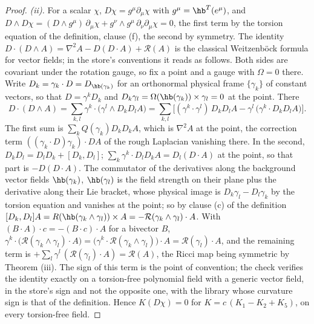 \begin{proof}
\emph{(ii).} For a scalar $\chi$, $D\chi = g^{\mu}\partial_{\mu}\chi$ with $g^{\mu} = \hb^{T}(e^{\mu})$, and $D\wedge D\chi = (D\wedge g^{\mu})\,\partial_{\mu}\chi + g^{\nu}\wedge g^{\mu}\,\partial_{\nu}\partial_{\mu}\chi = 0$, the first term by the torsion equation of the definition, clause (f), the second by symmetry. The identity $D\cdot(D\wedge A) = \nabla^{2}A - D(D\cdot A) + \mathcal{R}(A)$ is the classical Weitzenb\"ock formula for vector fields; in the store's conventions it reads as follows. Both sides are covariant under the rotation gauge, so fix a point and a gauge with $\Omega = 0$ there. Write $D_{k} = \gamma_{k}\cdot D = D_{\hb(\gamma_{k})}$ for an orthonormal physical frame $\{\gamma_{k}\}$ of constant vectors, so that $D = \gamma^{k}D_{k}$ and $D_{k}\gamma_{l} = \Omega(\hb(\gamma_{k}))\times\gamma_{l} = 0$ at the point. There
\[
D\cdot(D\wedge A) = \sum_{k,l}\gamma^{k}\cdot\bigl(\gamma^{l}\wedge D_{k}D_{l}A\bigr) = \sum_{k,l}\bigl[(\gamma^{k}\cdot\gamma^{l})\,D_{k}D_{l}A - \gamma^{l}\,\bigl(\gamma^{k}\cdot D_{k}D_{l}A\bigr)\bigr] .
\]
The first sum is $\sum_{k}Q(\gamma_{k})D_{k}D_{k}A$, which is $\nabla^{2}A$ at the point, the correction term $((\gamma_{k}\cdot D)\gamma_{k})\cdot D A$ of the rough Laplacian vanishing there. In the second, $D_{k}D_{l} = D_{l}D_{k} + [D_{k}, D_{l}]$; $\sum_{k}\gamma^{k}\cdot D_{l}D_{k}A = D_{l}(D\cdot A)$ at the point, so that part is $-D(D\cdot A)$. The commutator of the derivatives along the background vector fields $\hb(\gamma_{k})$, $\hb(\gamma_{l})$ is the field strength on their plane plus the derivative along their Lie bracket, whose physical image is $D_{k}\gamma_{l} - D_{l}\gamma_{k}$ by the torsion equation and vanishes at the point; so by clause (c) of the definition $[D_{k}, D_{l}]A = R(\hb(\gamma_{k}\wedge\gamma_{l}))\times A = -\mathcal{R}(\gamma_{k}\wedge\gamma_{l})\cdot A$. With $(B\cdot A)\cdot c = -(B\cdot c)\cdot A$ for a bivector $B$, $\gamma^{k}\cdot\bigl(\mathcal{R}(\gamma_{k}\wedge\gamma_{l})\cdot A\bigr) = \bigl(\gamma^{k}\cdot\mathcal{R}(\gamma_{k}\wedge\gamma_{l})\bigr)\cdot A = \mathcal{R}(\gamma_{l})\cdot A$, and the remaining term is $+\sum_{l}\gamma^{l}\,(\mathcal{R}(\gamma_{l})\cdot A) = \mathcal{R}(A)$, the Ricci map being symmetric by Theorem (iii). The sign of this term is the point of convention; the check verifies the identity exactly on a torsion-free polynomial field with a generic vector field, in the store's sign and not the opposite one, with the library whose curvature sign is that of the definition. Hence $K(D\chi) = 0$ for $K = c\,(K_{1} - K_{2} + K_{5})$, on every torsion-free field.


\end{proof}
